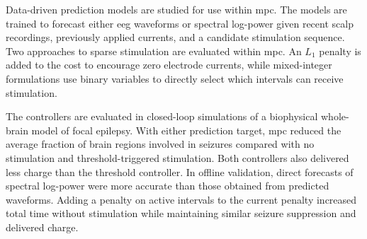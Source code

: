 \documentclass[
    english,
	ruledheaders=section,%
	class=report,%
	thesis={type=master},%
	accentcolor=2c, %
	custommargins=false,
	marginpar=false,
	BCOR=10mm, %
	parskip=half-, %
	fontsize=11pt, %
  	twoside,
  	numbers=noendperiod,
  	fleqn,
  	captions=oneline, %
	captions=tableheading, %
  	IMRAD=false
]{tudapub}
\begin{document}
Data-driven prediction models are studied for use within \acs*{mpc}.
The models are trained to forecast either \acs*{eeg} waveforms or spectral log-power given recent scalp recordings, previously applied currents, and a candidate stimulation sequence.
Two approaches to sparse stimulation are evaluated within \acs*{mpc}.
An $L_1$ penalty is added to the cost to encourage zero electrode currents, while mixed-integer formulations use binary variables to directly select which intervals can receive stimulation.

The controllers are evaluated in closed-loop simulations of a biophysical whole-brain model of focal epilepsy.
With either prediction target, \acs*{mpc} reduced the average fraction of brain regions involved in seizures compared with no stimulation and threshold-triggered stimulation.
Both controllers also delivered less charge than the threshold controller.
In offline validation, direct forecasts of spectral log-power were more accurate than those obtained from predicted waveforms.
Adding a penalty on active intervals to the current penalty increased total time without stimulation while maintaining similar seizure suppression and delivered charge.
\end{document}
